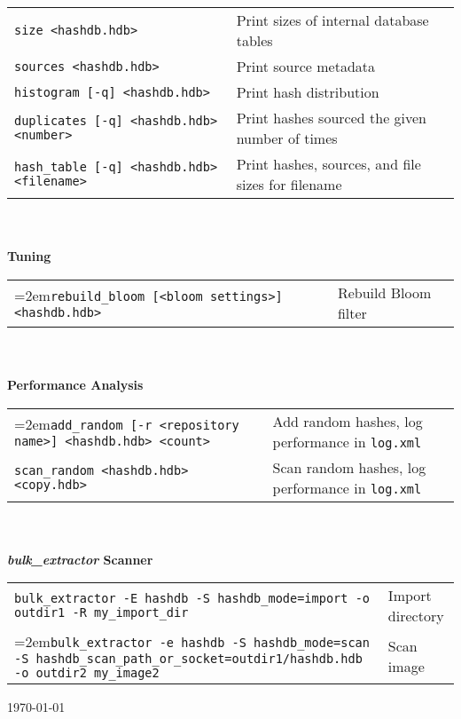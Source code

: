 \documentclass[12pt]{article}
\newcommand{\bulk}{\emph{bulk\_extractor}\xspace}
\begin{document}
\begin{tabular}{p{3.6 in} p{4 in}}
\small\small\texttt{size <hashdb.hdb>} & Print sizes of internal database tables \\
\small\texttt{sources <hashdb.hdb>} & Print source metadata \\
\small\texttt{histogram [-q] <hashdb.hdb>} & Print hash distribution \\
\small\texttt{duplicates [-q] <hashdb.hdb> <number>} & Print hashes sourced the given number of times \\
\small\texttt{hash\_table [-q] <hashdb.hdb> <filename>} & Print hashes, sources, and file sizes for filename\\
\end{tabular}
\\
\\
\textbf{Tuning}\\
\begin{tabular}{p{3.6 in} p{4 in}}
\hangindent=2em\small\texttt{rebuild\_bloom [<bloom settings>] <hashdb.hdb>} & Rebuild Bloom filter \\
\end{tabular}
\\
\\
\textbf{Performance Analysis}\\
\begin{tabular}{p{3.6 in} p{4 in}}
\hangindent=2em\small\texttt{add\_random [-r <repository name>] <hashdb.hdb> <count>} & Add random hashes, log performance in \texttt{log.xml}\\
\small\texttt{scan\_random <hashdb.hdb> <copy.hdb>} & Scan random hashes, log performance in \texttt{log.xml}\\
\end{tabular}
\\
\\
\textbf{\bulk Scanner}\\
\begin{tabular}{p{5.8 in} l}
\small\texttt{bulk\_extractor -E hashdb -S hashdb\_mode=import -o outdir1 -R my\_import\_dir} & Import directory\\
\hangindent=2em\small\texttt{bulk\_extractor -e hashdb -S hashdb\_mode=scan -S hashdb\_scan\_path\_or\_socket=outdir1/hashdb.hdb -o outdir2 my\_image2} & Scan image\\
\end{tabular}

\vspace{2mm}
\begin{center}
\begin{footnotesize}
\today
\end{footnotesize}
\end{center}
\end{document}
